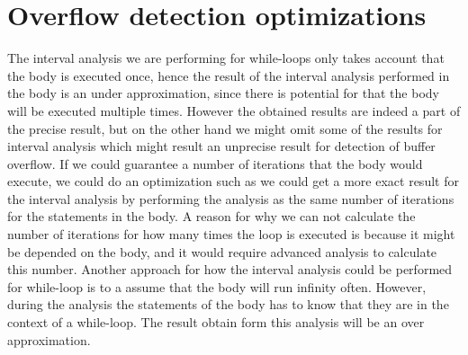 \section{Overflow detection optimizations}
The interval analysis we are performing for while-loops only takes account that the body is executed once, hence the result of the interval analysis performed in the body is an under approximation, since there is potential for that the body will be executed multiple times. However the obtained results are indeed a part of the precise result, but on the other hand we might omit some of the results for interval analysis which might result an unprecise result for detection of buffer overflow.
If we could guarantee a number of iterations that the body would execute, we could do an optimization such as we could get a more exact result for the interval analysis by performing the analysis as the same number of iterations for the statements in the body.   
A reason for why we can not calculate the number of iterations for how many times the loop is executed is because it might be depended on the body, and it would require advanced analysis to calculate this number.
Another approach for how the interval analysis could be performed for while-loop is to a assume that the body will run infinity often. However, during the analysis the statements of the body has to know that they are in the context of a while-loop. The result obtain form this analysis will be an over approximation.


